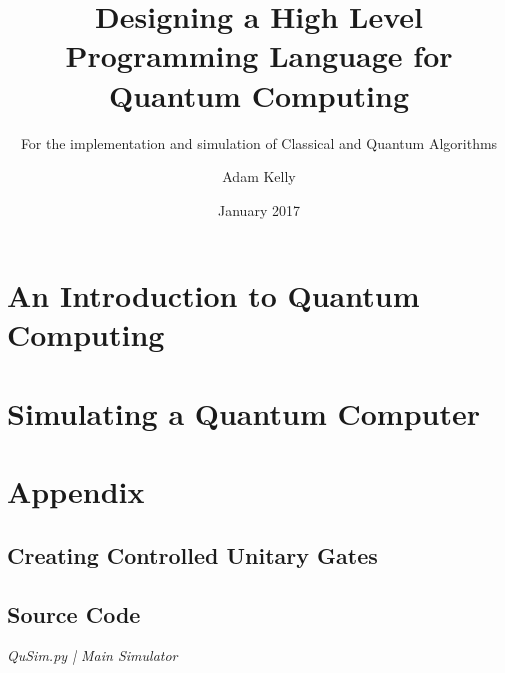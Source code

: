 \documentclass{scrartcl}
\title{Designing a High Level Programming Language for Quantum Computing}
\subtitle{For the implementation and simulation of Classical and Quantum Algorithms}
\author{Adam Kelly}
\date{January 2017}
\begin{document}
\begin{titlepage}
\maketitle
\end{titlepage}

\newpage
\tableofcontents
\newpage

\section{An Introduction to Quantum Computing}


\section{Simulating a Quantum Computer}


\newpage
\section{Appendix}
\subsection{Creating Controlled Unitary Gates}


\subsection{Source Code}

\emph{QuSim.py | Main Simulator}


\newpage
\printbibliography
\newpage
\end{document}
